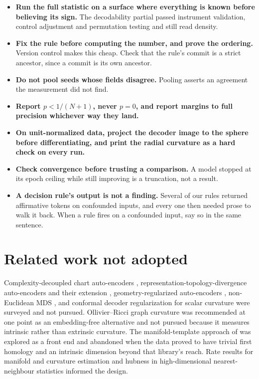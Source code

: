 \documentclass[11pt,a4paper]{article}
\begin{document}
\begin{itemize}
\item \textbf{Run the full statistic on a surface where everything is known before believing its sign.} The decodability partial passed instrument validation, control adjustment and permutation testing and still read density.

\item \textbf{Fix the rule before computing the number, and prove the ordering.} Version control makes this cheap. Check that the rule's commit is a strict ancestor, since a commit is its own ancestor.

\item \textbf{Do not pool seeds whose fields disagree.} Pooling asserts an agreement the measurement did not find.

\item \textbf{Report $p < 1/(N+1)$, never $p = 0$, and report margins to full precision whichever way they land.}

\item \textbf{On unit-normalized data, project the decoder image to the sphere before differentiating, and print the radial curvature as a hard check on every run.}

\item \textbf{Check convergence before trusting a comparison.} A model stopped at its epoch ceiling while still improving is a truncation, not a result.

\item \textbf{A decision rule's output is not a finding.} Several of our rules returned affirmative tokens on confounded inputs, and every one then needed prose to walk it back. When a rule fires on a confounded input, say so in the same sentence.
\end{itemize}

\section*{Related work not adopted}

Complexity-decoupled chart auto-encoders \citep{arxiv2208.10570}, representation-topology-divergence auto-encoders \citep{rtdae2023} and their extension \citep{arxiv2502.20215}, geometry-regularized auto-encoders \citep{arxiv2007.07142}, non-Euclidean MDS \citep{neucmds2024}, and conformal decoder regularization for scalar curvature \citep{arxiv2508.20413} were surveyed and not pursued. Ollivier--Ricci graph curvature \citep{arxiv2307.02378} was recommended at one point as an embedding-free alternative and not pursued because it measures intrinsic rather than extrinsic curvature. The manifold-template approach of \citet{acosta2022templates} was explored as a front end and abandoned when the data proved to have trivial first homology and an intrinsic dimension beyond that library's reach. Rate results for manifold and curvature estimation \citep{aamari2019nonasymptotic,cao2021weingarten} and hubness in high-dimensional nearest-neighbour statistics \citep{radovanovic2010hubs} informed the design.
\end{document}
